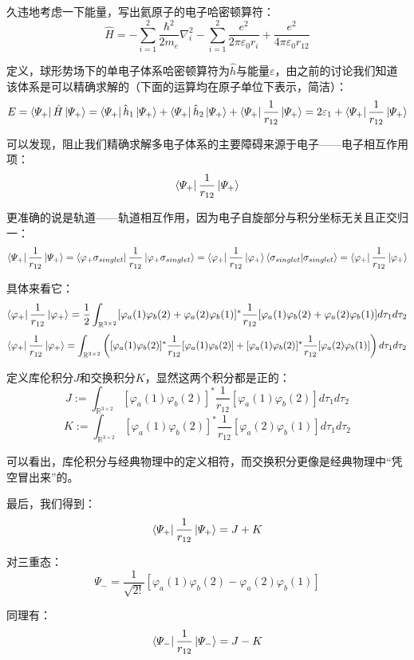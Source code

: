 久违地考虑一下能量，写出氦原子的电子哈密顿算符：
\[\hat{H}=-\sum_{i=1}^2\frac{\hbar^2}{2m_e}\nabla^2_i-\sum_{i=1}^2\frac{e^2}{2 \pi \varepsilon_0 r_{i}}+\frac{e^2}{4 \pi \varepsilon_0 r_{12}}\]

定义，球形势场下的单电子体系哈密顿算符为$\hat{h}$与能量$\varepsilon$，由之前的讨论我们知道该体系是可以精确求解的（下面的运算均在原子单位下表示，简洁）：
\[E=\bra{\varPsi_{+}}\hat{H}\ket{\varPsi_{+}}=\bra{\varPsi_{+}}\hat{h}_1\ket{\varPsi_{+}}+\bra{\varPsi_{+}}\hat{h}_2\ket{\varPsi_{+}}+\bra{\varPsi_{+}}\frac{1}{r_{12}}\ket{\varPsi_{+}}=2\varepsilon_{1}+\bra{\varPsi_{+}}\frac{1}{r_{12}}\ket{\varPsi_{+}}\]

可以发现，阻止我们精确求解多电子体系的主要障碍来源于电子——电子相互作用项：
\[\bra{\varPsi_{+}}\frac{1}{r_{12}}\ket{\varPsi_{+}}\]

更准确的说是轨道——轨道相互作用，因为电子自旋部分与积分坐标无关且正交归一：
\[\bra{\varPsi_{+}}\frac{1}{r_{12}}\ket{\varPsi_{+}}=\bra{\varphi_{+}\sigma_{singlet}}\frac{1}{r_{12}}\ket{\varphi_{+}\sigma_{singlet}}=\bra{\varphi_{+}}\frac{1}{r_{12}}\ket{\varphi_{+}}\bra{\sigma_{singlet}}\ket{\sigma_{singlet}}=\bra{\varphi_{+}}\frac{1}{r_{12}}\ket{\varphi_{+}}\]

具体来看它：
\[\bra{\varphi_{+}}\frac{1}{r_{12}}\ket{\varphi_{+}}=\frac{1}{2}\int_{\mathbb{R}^{3 \times 2}}[\varphi_a(1)\varphi_b(2)+\varphi_a(2)\varphi_b(1)]^{*}\frac{1}{r_{12}}[\varphi_a(1)\varphi_b(2)+\varphi_a(2)\varphi_b(1)]d\tau_1d\tau_2\]
\[\bra{\varphi_{+}}\frac{1}{r_{12}}\ket{\varphi_{+}}=\int_{\mathbb{R}^{3 \times 2}} \left ( [\varphi_a(1)\varphi_b(2)]^{*}\frac{1}{r_{12}}[\varphi_a(1)\varphi_b(2)]+[\varphi_a(1)\varphi_b(2)]^{*}\frac{1}{r_{12}}[\varphi_a(2)\varphi_b(1)] \right )d\tau_1d\tau_2\]

定义库伦积分$J$和交换积分$K$，显然这两个积分都是正的：
\[J:=\int_{\mathbb{R}^{3 \times 2}}[\varphi_a(1)\varphi_b(2)]^{*}\frac{1}{r_{12}}[\varphi_a(1)\varphi_b(2)]d\tau_1d\tau_2\]
\[K:=\int_{\mathbb{R}^{3 \times 2}}[\varphi_a(1)\varphi_b(2)]^{*}\frac{1}{r_{12}}[\varphi_a(2)\varphi_b(1)]d\tau_1d\tau_2\]

可以看出，库伦积分与经典物理中的定义相符，而交换积分更像是经典物理中“凭空冒出来”的。

最后，我们得到：
\[\bra{\varPsi_{+}}\frac{1}{r_{12}}\ket{\varPsi_{+}}=J+K\]

对三重态：
\[\varPsi_{-}=\frac{1}{\sqrt{2!}}[\varphi_a(1)\varphi_b(2)-\varphi_a(2)\varphi_b(1)]\]

同理有：
\[\bra{\varPsi_{-}}\frac{1}{r_{12}}\ket{\varPsi_{-}}=J-K\]

